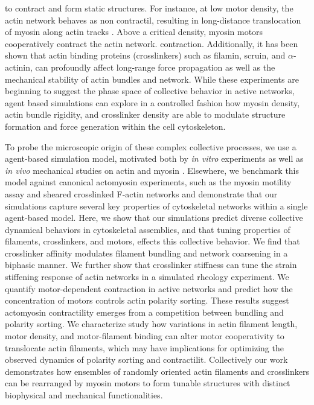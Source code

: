 \documentclass[12pt]{article}
\begin{document}
to contract and form static structures\cite{murrell2012, murrell2014, stam2016}.
For instance, at low motor density, the 
actin network behaves as non contractil, resulting in long-distance 
translocation of myosin along actin tracks \cite{burov2013}. Above a
critical density, myosin motors cooperatively contract the actin network.
contraction. Additionally, it has been shown that actin binding proteins 
(crosslinkers) such as filamin, scruin, and $\alpha$-actinin, can profoundly 
affect long-range force propagation as well as the mechanical stability of actin
bundles and network\cite{murrell2012, murrell2014, murrell2015, gardel2004}. 
While these experiments are beginning to suggest the phase space of 
collective behavior in active networks, agent based simulations can explore in a
controlled fashion how myosin density, actin bundle rigidity, and crosslinker
density are able to modulate structure formation and force generation within the
cell cytoskeleton. 
\par
To probe the microscopic origin of these complex collective processes, we 
use a agent-based simulation model, motivated both by {\em in vitro } 
experiments as well as {\em in vivo} mechanical studies on actin and myosin 
\cite{guha2005,wilson2010}.  Elsewhere, we benchmark this model against 
canonical actomyosin experiments, such as the myosin motility assay and sheared 
crosslinked F-actin networks \cite{freedman2016} and demonstrate that our 
simulations capture several key properties of cytoskeletal networks within a
single agent-based model. 
Here, we show that our simulations predict diverse collective dynamical behaviors
in cytoskeletal assemblies, and that tuning properties of filaments, 
crosslinkers, and motors, effects this collective behavior. 
We find that crosslinker affinity modulates filament bundling and network 
coarsening in a biphasic manner. We further show that crosslinker 
stiffness can tune the strain stiffening response of actin networks in a 
simulated rheology experiment. We quantify motor-dependent contraction in active
networks and predict how the concentration of motors controls actin polarity 
sorting. These results suggest actomyosin contractility emerges from a 
competition between bundling and polarity sorting. We characterize study how 
variations in actin filament length, motor density, and motor-filament binding 
can alter motor cooperativity to translocate actin filaments, which may have
implications for optimizing the observed dynamics of polarity sorting and 
contractilit. Collectively our work demonstrates how ensembles of randomly
oriented actin filaments and crosslinkers can be rearranged by myosin motors to 
form tunable structures with distinct biophysical and mechanical functionalities. 
\end{document}

